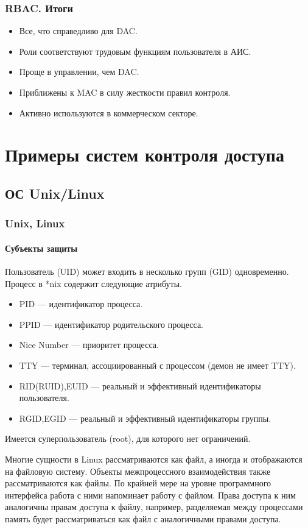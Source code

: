 \begin{frame}
    \frametitle{RBAC. Итоги}
    \begin{itemize}
        \item Все, что справедливо для DAC.
        \item Роли соответствуют трудовым функциям пользователя в АИС.
        \item Проще в управлении, чем DAC.
        \item Приближены к MAC в силу жесткости правил контроля.
        \item Активно используются в коммерческом секторе.
    \end{itemize}
\end{frame}


\section{Примеры систем контроля доступа}


\subsection{ОС Unix/Linux}


\begin{frame}
    \frametitle{Unix, Linux}
    \framesubtitle{Субъекты защиты}
    Пользователь (UID) может входить в несколько групп (GID) одновременно. Процесс в *nix содержит следующие атрибуты.
    \begin{itemize}
        \item PID --- идентификатор процесса.
        \item PPID --- идентификатор родительского процесса.
        \item Nice Number --- приоритет процесса.
        \item TTY --- терминал, ассоциированный с процессом (демон не имеет TTY).
        \item RID(RUID),EUID --- реальный и эффективный идентификаторы пользователя.
        \item RGID,EGID --- реальный и эффективный идентификаторы группы.
    \end{itemize}
    Имеется суперпользователь (\alert{root}), для которого \alert{нет} ограничений.
\end{frame}


Многие сущности в Linux рассматриваются как файл, а иногда и отображаются на файловую систему. Объекты межпроцессного взаимодействия также рассматриваются как файлы. По крайней мере на уровне программного интерфейса работа с ними напоминает работу с файлом. Права доступа к ним аналогичны правам доступа к файлу, например, разделяемая между процессами память будет рассматриваться как файл с аналогичными правами доступа.


